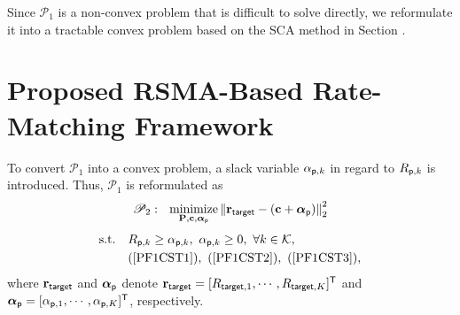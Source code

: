 \documentclass[draftclsnofoot, onecolumn, comsoc, 12pt]{IEEEtran}
\DeclareMathOperator*{\minimize}{minimize}
\begin{document}
Since $\mathscr{P}_1$ is a non-convex problem that is difficult to solve directly, we reformulate it into a tractable convex problem based on the SCA method in Section \uppercase\expandafter{}.


\section{Proposed RSMA-Based Rate-Matching Framework}
To convert $\mathscr{P}_1$ into a convex problem, a slack variable $\alpha_{{\sf{p}},k}$ in regard to $R_{{\sf{p}},k}$ is introduced. Thus, $\mathscr{P}_1$ is reformulated as
\begin{align}
\nonumber
\mathscr{P}_2: \,\,\,\, 
\minimize_{\mathbf{P}, \mathbf{c}, \boldsymbol{\alpha}_{\sf{p}}} 
{\Vert {\mathbf{r}_{\sf target}- ( \mathbf{c} + \boldsymbol{\alpha}_{\sf{p}} )} \Vert}_{2}^{2}
\end{align}\setcounter{equation}{20}%
\begin{subequations}
\begin{align}
\mathrm{s.t.}\,\,\,\,\,\,
\label{PF2CST1}
&R_{{\sf{p}},k} \geq \alpha_{{\sf{p}},k},   \,\, \alpha_{{\sf{p}},k} \geq 0, \,\, \forall k \in \mathcal{K}, \\
& \textrm{(\ref{PF1CST1})}, \,\, \textrm{(\ref{PF1CST2})}, \,\,  \textrm{(\ref{PF1CST3})}, \nonumber
\end{align}
\end{subequations}
where $\mathbf{r}_{\sf target}$ and $\boldsymbol{\alpha}_{\sf{p}}$ denote $\mathbf{r}_{\sf target}=[R_{{\sf target}, {1}},\cdots,R_{{\sf target}, {K}}]^{\sf{T}}$ and $\boldsymbol{\alpha}_{\sf{p}}=[\alpha_{{\sf{p}},1},\cdots,\alpha_{{\sf{p}},K}]^{\sf{T}}$, respectively. %
\end{document}

